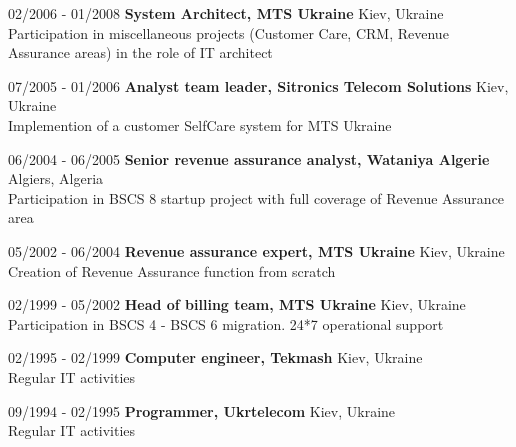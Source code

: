 \documentclass[10pt,a4paper]{extbook}
\begin{document}
\par\vspace{5mm}
02/2006 - 01/2008 \hspace{10mm} \textbf{System Architect, MTS Ukraine} \hfill Kiev, Ukraine \\
Participation in miscellaneous projects (Customer Care, CRM, Revenue Assurance areas) in the role of IT architect
	
\par\vspace{5mm}
07/2005 - 01/2006 \hspace{10mm} \textbf{Analyst team leader, Sitronics Telecom Solutions} \hfill Kiev, Ukraine \\
Implemention of a customer SelfCare system for MTS Ukraine
	
\par\vspace{5mm}
06/2004 - 06/2005 \hspace{10mm} \textbf{Senior revenue assurance analyst, Wataniya Algerie} \hfill Algiers, Algeria \\ 
Participation in BSCS 8 startup project with full coverage of Revenue Assurance area
	
\par\vspace{5mm}
05/2002 - 06/2004 \hspace{10mm} \textbf{Revenue assurance expert, MTS Ukraine} \hfill Kiev, Ukraine \\
Creation of Revenue Assurance function from scratch

\par\vspace{5mm}
02/1999 - 05/2002 \hspace{10mm} \textbf{Head of billing team, MTS Ukraine} \hfill Kiev, Ukraine \\
Participation in BSCS 4 - BSCS 6 migration. 24*7 operational support

\par\vspace{5mm}
02/1995 - 02/1999 \hspace{10mm} \textbf{Computer engineer, Tekmash} \hfill Kiev, Ukraine \\
Regular IT activities

\par\vspace{5mm}
09/1994 - 02/1995 \hspace{10mm} \textbf{Programmer, Ukrtelecom} \hfill Kiev, Ukraine \\
Regular IT activities
\end{document}
